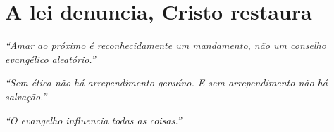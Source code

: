 \section{A lei denuncia, Cristo restaura}

\textit{“Amar ao próximo é reconhecidamente um mandamento, não um conselho evangélico aleatório.”} \cite[p. 745]{calvino2022}

\textit{“Sem ética não há arrependimento genuíno. E sem arrependimento não há salvação.”} \cite[p. 102]{stott2008}

\textit{“O evangelho influencia todas as coisas.”} \cite[p. 56]{keller2014}
